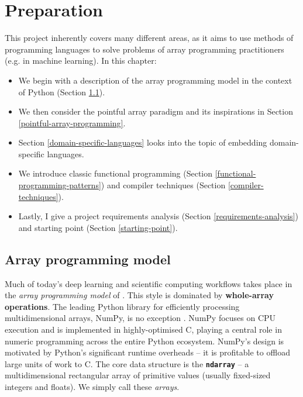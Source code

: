 \chapter{Preparation}

This project inherently covers many different areas, as it aims to use methods of programming languages to solve problems of array programming practitioners (e.g. in machine learning). In this chapter:
\begin{itemize}
    \item We begin with a description of the array programming model in the context of Python (Section \ref{array-programming-model}).
    \item We then consider the pointful array paradigm and its inspirations in Section \ref{pointful-array-programming}.
    \item Section \ref{domain-specific-languages} looks into the topic of embedding domain-specific languages.
    \item We introduce classic functional programming (Section \ref{functional-programming-patterns}) and compiler techniques (Section \ref{compiler-techniques}).
    \item Lastly, I give a project requirements analysis (Section \ref{requirements-analysis}) and starting point (Section \ref{starting-point}).
\end{itemize}

\section{Array programming model}
\label{array-programming-model}

Much of today's deep learning and scientific computing workflows takes place in the \textit{array programming model} of \textcite{iverson1962programming}. 
This style is dominated by \textbf{whole-array operations}. 
The leading Python library for efficiently processing multidimensional arrays, NumPy, is no exception \cite{harris2020array}. 
NumPy focuses on CPU execution and is implemented in highly-optimised C, playing a central role in numeric programming across the entire Python ecosystem. 
NumPy's design is motivated by Python's significant runtime overheads -- it is profitable to offload large units of work to C. The core data structure is the \texttt{\textbf{ndarray}} -- a multidimensional rectangular array of primitive values (usually fixed-sized integers and floats). We simply call these \textit{arrays}. 

